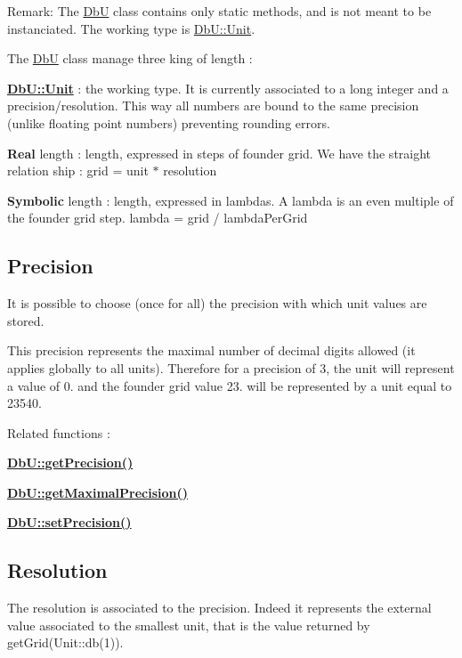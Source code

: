 \begin{DoxyParagraph}{Remark\-:}
The \hyperlink{classHurricane_1_1DbU}{Db\-U} class contains only static methods, and is not meant to be instanciated. The working type is \hyperlink{group__DbUGroup_ga4fbfa3e8c89347af76c9628ea06c4146}{Db\-U\-::\-Unit}.
\end{DoxyParagraph}
The \hyperlink{classHurricane_1_1DbU}{Db\-U} class manage three king of length \-: 
\begin{DoxyItemize}
\item {\bfseries \hyperlink{group__DbUGroup_ga4fbfa3e8c89347af76c9628ea06c4146}{Db\-U\-::\-Unit}} \-: the working type. It is currently associated to a long integer and a precision/resolution. This way all numbers are bound to the same precision (unlike floating point numbers) preventing rounding errors. 
\item {\bfseries Real} length \-: length, expressed in steps of founder grid. We have the straight relation ship \-: grid = unit $\ast$ resolution 
\item {\bfseries Symbolic} length \-: length, expressed in lambdas. A lambda is an even multiple of the founder grid step. lambda = grid / lambda\-Per\-Grid 
\end{DoxyItemize}\hypertarget{group__DbUGroup_secDbUPrecision}{}\subsection{Precision}\label{group__DbUGroup_secDbUPrecision}
It is possible to choose (once for all) the precision with which unit values are stored.

This precision represents the maximal number of decimal digits allowed (it applies globally to all units). Therefore for a precision of 3, the unit will represent a value of 0. and the founder grid value 23. will be represented by a unit equal to 23540.

Related functions \-: 
\begin{DoxyItemize}
\item {\bfseries \hyperlink{group__DbUGroup_ga6169efbdd9b3d54a0bd8467c8f957fda}{Db\-U\-::get\-Precision()}} 
\item {\bfseries \hyperlink{group__DbUGroup_ga8756c9f0a32af5f601cd150e73b02c03}{Db\-U\-::get\-Maximal\-Precision()}} 
\item {\bfseries \hyperlink{group__DbUGroup_gace9a8644e7e80dcaed2a8a95deeb1622}{Db\-U\-::set\-Precision()}} 
\end{DoxyItemize}\hypertarget{group__DbUGroup_secDbUResolution}{}\subsection{Resolution}\label{group__DbUGroup_secDbUResolution}
The resolution is associated to the precision. Indeed it represents the external value associated to the smallest unit, that is the value returned by get\-Grid(Unit\-::db(1)).

